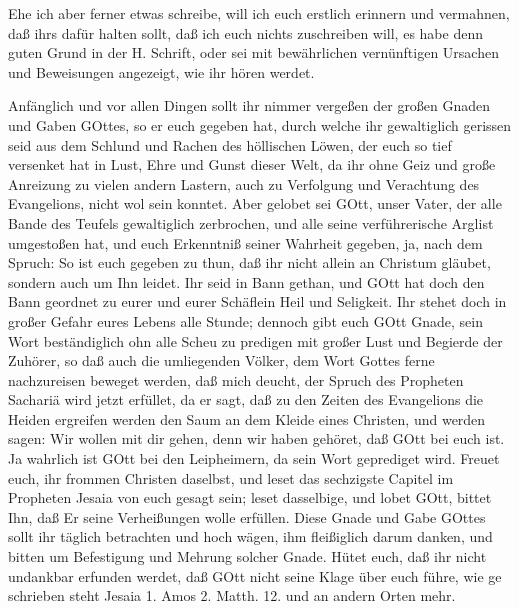 Ehe ich aber ferner etwas schreibe, will ich euch erstlich erinnern und vermahnen, daß ihrs dafür halten sollt, daß ich euch nichts zuschreiben will, es habe denn guten Grund in der H. Schrift, oder sei mit bewährlichen vernünftigen Ursachen und Beweisungen angezeigt, wie ihr hören werdet.

Anfänglich und vor allen Dingen sollt ihr nimmer vergeßen der großen Gnaden und Gaben GOttes, so er euch gegeben hat, durch welche ihr gewaltiglich gerissen seid aus dem Schlund und Rachen des höllischen Löwen, der euch so tief versenket hat in Lust, Ehre und Gunst dieser Welt, da ihr ohne Geiz und große Anreizung zu vielen andern Lastern, auch zu Verfolgung und Verachtung des Evangelions, nicht wol sein konntet. Aber gelobet sei GOtt, unser Vater, der alle Bande des Teufels gewaltiglich zerbrochen, und alle seine verführerische Arglist umgestoßen hat, und euch Erkenntniß seiner Wahrheit gegeben, ja, nach dem Spruch: So ist euch gegeben zu thun, daß ihr nicht allein an Christum gläubet, sondern auch um Ihn leidet. Ihr seid in Bann gethan, und GOtt hat doch den Bann geordnet zu eurer und eurer Schäflein Heil und Seligkeit. Ihr stehet doch in großer Gefahr eures Lebens alle Stunde; dennoch gibt euch GOtt Gnade, sein Wort beständiglich ohn alle Scheu zu predigen mit großer Lust und Begierde der Zuhörer, so daß auch die umliegenden Völker, dem Wort Gottes ferne nachzureisen beweget werden, daß mich deucht, der Spruch des Propheten Sachariä wird jetzt erfüllet, da er sagt, daß zu den Zeiten des Evangelions die Heiden ergreifen werden den Saum an dem Kleide eines Christen, und werden sagen: Wir wollen mit dir gehen, denn wir haben gehöret, daß GOtt bei euch ist. Ja wahrlich ist GOtt bei den Leipheimern, da sein Wort geprediget wird. Freuet euch, ihr frommen Christen daselbst, und leset das sechzigste Capitel im Propheten Jesaia von euch gesagt sein; leset dasselbige, und lobet GOtt, bittet Ihn, daß Er seine Verheißungen wolle erfüllen. Diese Gnade und Gabe GOttes sollt ihr täglich betrachten und hoch wägen, ihm fleißiglich darum danken, und bitten um Befestigung und Mehrung solcher Gnade. Hütet euch, daß ihr nicht undankbar erfunden werdet, daß GOtt nicht seine Klage über euch führe, wie ge%
schrieben steht Jesaia 1. Amos 2. Matth. 12. und an andern Orten mehr.

